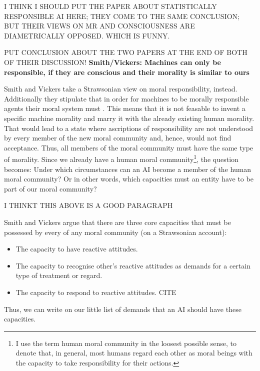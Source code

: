 \documentclass{article}
\begin{document}
I THINK I SHOULD PUT THE PAPER ABOUT STATISTICALLY RESPONSIBLE AI HERE; THEY
COME TO THE SAME CONCLUSION; BUT THEIR VIEWS ON MR AND CONSCIOUSNESS ARE
DIAMETRICALLY OPPOSED. WHICH IS FUNNY.

PUT CONCLUSION ABOUT THE TWO PAPERS AT THE END OF BOTH OF THEIR DISCUSSION!
\newpage
\textbf{Smith/Vickers: Machines can only be responsible, if they are conscious and their
morality is similar to ours}

Smith and Vickers take a Strawsonian view on moral responsibility, instead.
Additionally they stipulate that in order for machines to be morally responsible
agents their moral system must . This means that it is not feasable to invent a specific machine morality
and marry it with the already existing human morality. That would lead to a
state where ascriptions of responsibility are not understood by every member of
the new moral community and, hence, would not find acceptance. Thus, all members
of the moral community must have the same type of morality. Since we already
have a human moral community\footnote{I use the term human moral community in
	the loosest possible sense, to denote that, in general, most humans
	regard each other as moral beings with the capacity to take
responsibility for their actions.}, the question becomes: Under which
circumstances can an AI become a member of the human moral community? Or in
other words, which capacities must an entity have to be part of our moral
community?

I THINKT THIS ABOVE IS A GOOD PARAGRAPH 


%
%
Smith and Vickers argue that there are three core capacities that must be
possessed by every  of any moral community (on a Strawsonian
account):


\begin{itemize}
	\item The capacity to have reactive attitudes.
	\item The capacity to recognise other's reactive attitudes as demands
		for a certain type of treatment or regard.
	\item The capacity to respond to reactive attitudes. CITE
\end{itemize}
Thus, we can write on our little list of demands that an AI should have these
capacities.
\end{document}

